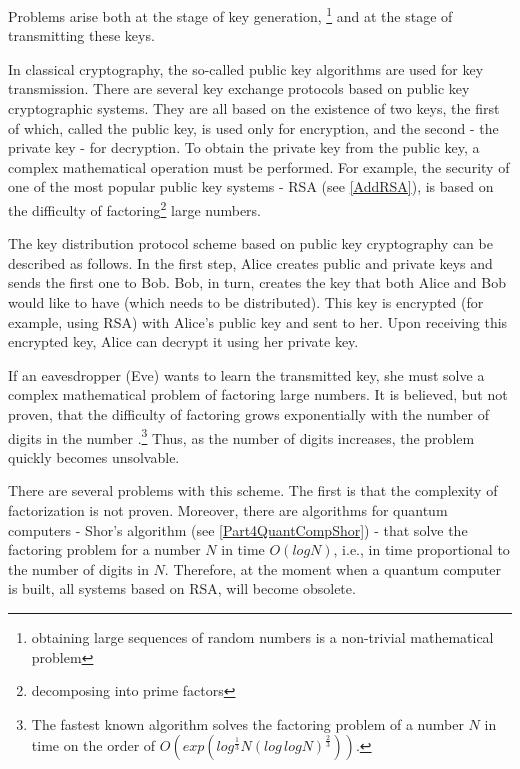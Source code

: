 Problems arise both at the stage of key generation, \footnote{obtaining large sequences of random numbers is a non-trivial mathematical problem} and at the stage of transmitting these keys.

In classical cryptography, the so-called public key algorithms are used for key transmission. There are several key exchange protocols based on public key cryptographic systems. They are all based on the existence of two keys, the first of which, called the public key, is used only for encryption, and the second - the private key - for decryption. To obtain the private key from the public key, a complex mathematical operation must be performed. For example, the security of one of the most popular public key systems - RSA (see \ref{AddRSA}),
is based on the difficulty of factoring\footnote{decomposing into prime factors} large numbers.

The key distribution protocol scheme based on public key cryptography can be described as follows. In the first step, Alice creates public and private keys and sends the first one to Bob. Bob, in turn, creates the key that both Alice and Bob would like to have (which needs to be distributed). This key is encrypted (for example, using RSA) with Alice's public key and sent to her. Upon receiving this encrypted key, Alice can decrypt it using her private key.

If an eavesdropper (Eve) wants to learn the transmitted key, she must solve a complex mathematical problem of factoring large numbers. It is believed, but not proven, that the difficulty of factoring grows exponentially with the number of digits in the number \cite{bPhisQuantInfo}.\footnote{The fastest known algorithm solves the factoring problem of a number $N$ in time on the order of $O\left(exp\left(log^{\frac{1}{3}}N\left(log \, log N\right)^{\frac{2}{3}}\right)\right)$.} Thus, as the number of digits increases, the problem quickly becomes unsolvable.

There are several problems with this scheme. The first is that the complexity of factorization is not proven. Moreover, there are algorithms for quantum computers - Shor's algorithm (see \ref{Part4QuantCompShor}) - that solve the factoring problem for a number $N$ in time $O\left(log N\right)$, i.e., in time proportional to the number of digits in $N$. Therefore, at the moment when a quantum computer is built, all systems based on RSA, will become obsolete.

